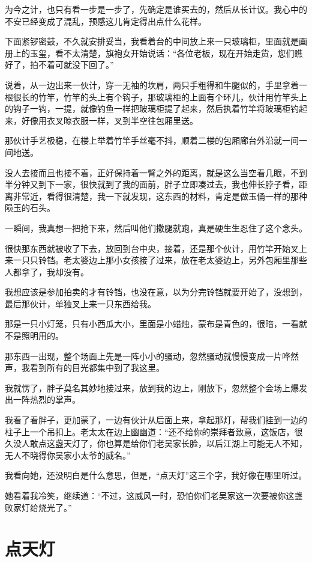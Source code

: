 为今之计，也只有看一步是一步了，先确定是谁买去的，然后从长计议。我心中的不安已经变成了混乱，预感这儿肯定得出点什么花样。

下面紧锣密鼓，不久就安排妥当，我看着台的中间放上来一只玻璃柜，里面就是画册上的玉玺，看不太清楚，旗袍女开始说话：“各位老板，现在开始走货，您们瞧好了，拍不着可就没下回了。”

说着，从一边出来一伙计，穿一无袖的坎肩，两只手粗得和牛腿似的，手里拿着一根很长的竹竿，竹竿的头上有个钩子，那玻璃柜的上面有个环儿，伙计用竹竿头上的钩子一钩，一提，就像钓鱼一样把玻璃柜提了起来，然后执着竹竿将玻璃柜钓起来，好像用衣叉晾衣服一样，叉到半空往包厢里送。

那伙计手艺极稳，在楼上举着竹竿手丝毫不抖，顺着二楼的包厢廊台外沿就一间一间地送。

没人去接而且也接不着，正好保持着一臂之外的距离，就是这么当空看几眼，不到半分钟又到下一家，很快就到了我的面前，胖子立即凑过去，我也伸长脖子看，距离非常近，看得很清楚，我一下就发现，这东西的材料，肯定是做玉俑一样的那种陨玉的石头。

一瞬间，我真想一把抢下来，然后叫他们撒腿就跑，真是硬生生忍住了这个念头。

很快那东西就被收了下去，放回到台中央，接着，还是那个伙计，用竹竿开始叉上来一只只铃铛。老太婆边上那小女孩接了过来，放在老太婆边上，另外包厢里那些人都拿了，我却没有。

我想应该是参加拍卖的才有铃铛，也没在意，以为分完铃铛就要开始了，没想到，最后那伙计，单独叉上来一只东西给我。

那是一只小灯笼，只有小西瓜大小，里面是小蜡烛，蒙布是青色的，很暗，一看就不是照明用的。

那东西一出现，整个场面上先是一阵小小的骚动，忽然骚动就慢慢变成一片哗然声，我看到所有的目光都集中到了我这里。

我就愣了，胖子莫名其妙地接过来，放到我的边上，刚放下，忽然整个会场上爆发出一阵热烈的掌声。

我看了看胖子，更加蒙了，一边有伙计从后面上来，拿起那灯，帮我们挂到一边的柱子上一个吊扣上。老太太在边上幽幽道：“还不给你的崇拜者致意，这饭店，很久没人敢点这盏天灯了，你也算是给你们老吴家长脸，以后江湖上可能无人不知，无人不晓得你吴家小太爷的威名。”

我看向她，还没明白是什么意思，但是，“点天灯”这三个字，我好像在哪里听过。

她看着我冷笑，继续道：“不过，这威风一时，恐怕你们老吴家这一次要被你这盏败家灯给烧光了。”

\chapter{点天灯}

